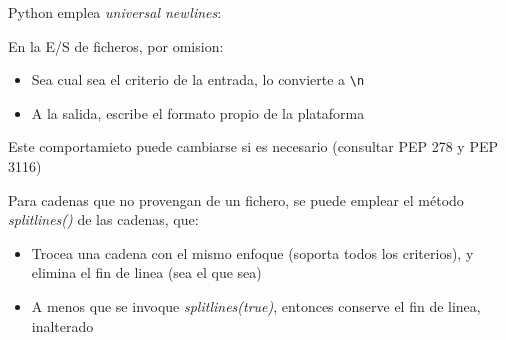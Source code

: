 \documentclass[ucs]{beamer}
\begin{document}
\begin{frame}[fragile]
\frametitle{}

Python emplea \emph{universal newlines}:

En la E/S de ficheros, por omision:

\begin{itemize}
\item 
Sea cual sea el criterio de la entrada, lo convierte a \verb|\n|
\item
A la salida, escribe el formato propio de la plataforma
\end{itemize}

Este comportamieto puede cambiarse si es necesario (consultar PEP 278 y PEP 3116)


Para cadenas que no provengan de un fichero, se puede emplear
el método \emph{splitlines()} de las cadenas, que:

\begin{itemize}
\item
Trocea una cadena con el mismo enfoque
(soporta todos los criterios), y elimina el fin de linea (sea el que sea)
\item
A menos que se invoque \emph{splitlines(true)}, entonces conserve el
fin de linea, inalterado
\end{itemize}






\end{frame}
\end{document}
